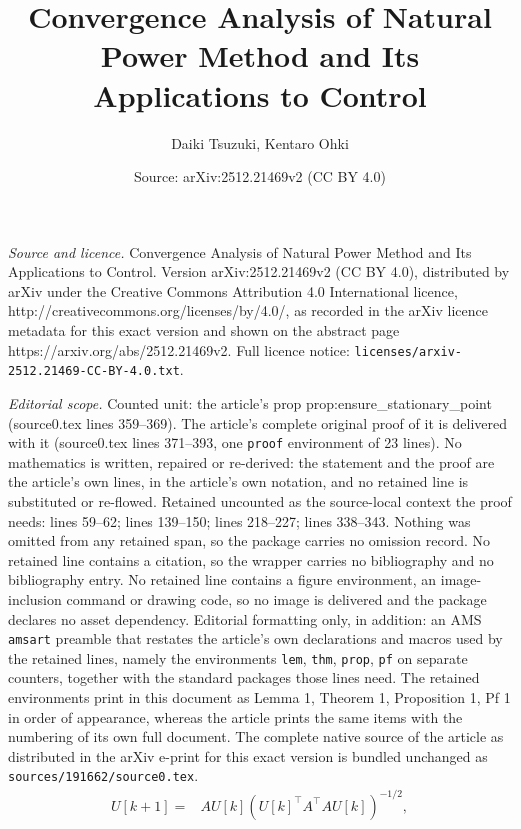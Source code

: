 \documentclass[10pt,a4paper]{amsart}
\title{Convergence Analysis of Natural Power Method and Its Applications to Control}
\author{Daiki Tsuzuki, Kentaro Ohki}
\date{Source: arXiv:2512.21469v2 (CC BY 4.0)}
\begin{document}
\maketitle

\noindent\emph{Source and licence.} Convergence Analysis of Natural Power Method and Its Applications to Control. Version arXiv:2512.21469v2 (CC BY 4.0), distributed by arXiv under the Creative Commons Attribution 4.0 International licence, http://creativecommons.org/licenses/by/4.0/, as recorded in the arXiv licence metadata for this exact version and shown on the abstract page https://arxiv.org/abs/2512.21469v2. Full licence notice: \texttt{licenses/arxiv-2512.21469-CC-BY-4.0.txt}.\par\smallskip

\noindent\textit{Editorial scope.} Counted unit: the article's prop prop:ensure\_stationary\_point (source0.tex lines 359--369). The article's complete original proof of it is delivered with it (source0.tex lines 371--393, one \texttt{proof} environment of 23 lines). No mathematics is written, repaired or re-derived: the statement and the proof are the article's own lines, in the article's own notation, and no retained line is substituted or re-flowed.  Retained uncounted as the source-local context the proof needs: lines 59--62; lines 139--150; lines 218--227; lines 338--343.  Nothing was omitted from any retained span, so the package carries no omission record.  No retained line contains a citation, so the wrapper carries no bibliography and no bibliography entry.  No retained line contains a figure environment, an image-inclusion command or drawing code, so no image is delivered and the package declares no asset dependency.  Editorial formatting only, in addition: an AMS \texttt{amsart} preamble that restates the article's own declarations and macros used by the retained lines, namely the environments \texttt{lem}, \texttt{thm}, \texttt{prop}, \texttt{pf} on separate counters, together with the standard packages those lines need.  The retained environments print in this document as Lemma 1, Theorem 1, Proposition 1, Pf 1 in order of appearance, whereas the article prints the same items with the numbering of its own full document.  The complete native source of the article as distributed in the arXiv e-print for this exact version is bundled unchanged as \texttt{sources/191662/source0.tex}.
\begin{align}
    U[k+1] =& A U[k] (U[k]^{\top} A^{\top} A U[k]) ^{-1/2}, 
    \label{eq:natural_power_method}
\end{align}
\end{document}
